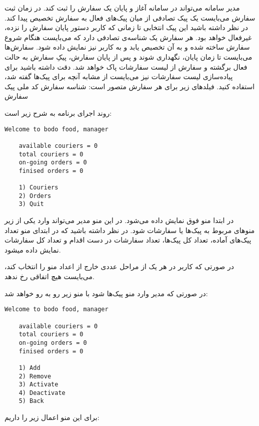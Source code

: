 \documentclass[../main.tex]{subfiles}
\begin{document}

مدیر سامانه می‌تواند در سامانه آغاز و پایان یک سفارش را ثبت کند. در زمان ثبت سفارش می‌بایست یک پیک تصادفی از میان پیک‌های فعال به سفارش تخصیص پیدا کند. در نظر داشته باشید این پیک انتخابی تا زمانی که کاربر دستور پایان سفارش را نزده، غیرفعال خواهد بود.
هر سفارش یک شناسه‌ی تصادفی دارد که می‌بایست هنگام شروع سفارش ساخته شده و به آن تخصیص یابد و به کاربر نیز نمایش داده شود. سفارش‌ها می‌بایست تا زمان پایان، نگهداری شوند و پس از پایان سفارش، پیکِ سفارش به حالت فعال برگشته و سفارش از لیست سفارشات پاک خواهد شد. دقت داشته باشید برای پیاده‌سازی لیست سفارشات نیز می‌بایست از مشابه آنچه برای پیک‌ها گفته شد، استفاده کنید.
فیلدهای زیر برای هر سفارش متصور است:
 شناسه سفارش
 کد ملی پیک سفارش


روند اجرای برنامه به شرح زیر است:

\begin{latin}
\begin{lstlisting}[]
    Welcome to bodo food, manager

    available couriers = 0
    total couriers = 0
    on-going orders = 0
    finised orders = 0

    1) Couriers
    2) Orders
    3) Quit
\end{lstlisting}
\end{latin}

در ابتدا منو فوق نمایش داده می‌شود. در این منو مدیر می‌تواند وارد یکی از زیر منوهای مربوط به پیک‌ها یا سفارشات شود.
در نظر داشته باشید که در ابتدای منو تعداد پیک‌های آماده، تعداد کل پیک‌ها، تعداد سفارشات در دست اقدام و تعداد کل سفارشات نمایش داده میشود.

در صورتی که کاربر در هر یک از مراحل عددی خارج از اعداد منو را انتخاب کند، می‌بایست هیچ اتفاقی رخ ندهد.

در صورتی که مدیر وارد منو پیک‌ها شود با منو زیر رو به رو خواهد شد:


\begin{latin}
\begin{lstlisting}[]
    Welcome to bodo food, manager

    available couriers = 0
    total couriers = 0
    on-going orders = 0
    finised orders = 0

    1) Add
    2) Remove
    3) Activate
    4) Deactivate
    5) Back
\end{lstlisting}
\end{latin}

برای این منو اعمال زیر را داریم:
\end{document}
